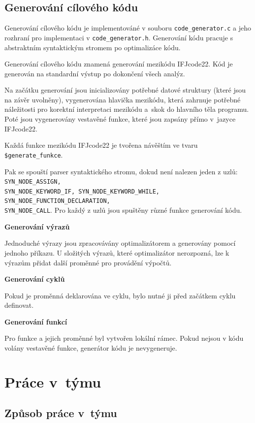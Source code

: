 \documentclass[a4paper, 11pt]{article}
\begin{document}
	\subsection{Generování cílového kódu}
    Generování cílového kódu je implementováné v souboru \texttt{code\_generator.c} a jeho rozhraní pro implementaci
	v \texttt{code\_generator.h}.  Generování kódu pracuje s abstraktním syntaktickým stromem po optimalizáce kódu.

    Generování cílového kódu znamená generování mezikódu IFJcode22. Kód je generován na standardní výstup po dokončení všech analýz.

	Na začátku generování jsou inicializovány potřebné datové struktury (které jsou na závěr uvolněny), vygenerována hlavička mezikódu, která zahrnuje potřebné náležitosti pro korektní interpretaci mezikódu a~skok do hlavního těla programu. Poté jsou vygenerovány vestavěné funkce, které jsou zapsány přímo v~jazyce IFJcode22.

     Každá funkce mezikódu IFJcode22 je tvořena návěštím ve tvaru \texttt{\$generate\_funkce}.

    Pak se spouští parser syntaktického stromu, dokud není nalezen jeden z uzlů: \texttt{SYN\_NODE\_ASSIGN, \\SYN\_NODE\_KEYWORD\_IF, SYN\_NODE\_KEYWORD\_WHILE, SYN\_NODE\_FUNCTION\_DECLARATION, \\SYN\_NODE\_CALL}. Pro každý z uzlů jsou spuštěny různé funkce generování kódu.

    \textbf{Generování výrazů}

    Jednoduché výrazy jsou zpracovávány optimalizátorem a generovány pomocí jednoho příkazu.
    U složitých výrazů, které optimalizátor nerozpozná, lze k výrazům přidat další proměnné pro provádění výpočtů.

    \textbf{Generování cyklů}

    Pokud je proměnná deklarována ve cyklu, bylo nutné ji před začátkem cyklu definovat.

    \textbf{Generování funkcí}

    Pro funkce a jejich proměnné byl vytvořen lokální rámec.
     Pokud nejsou v kódu volány vestavěné funkce, generátor kódu je nevygeneruje.


	\section{Práce v~týmu}

	\subsection{Způsob práce v~týmu}
\end{document}
